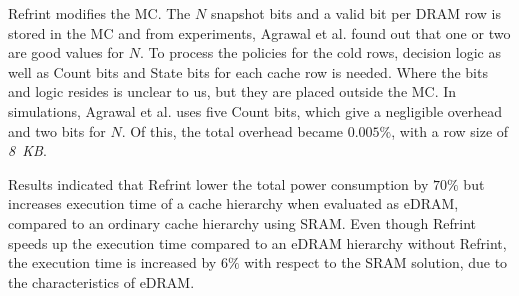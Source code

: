 Refrint modifies the MC. The $N$ snapshot bits and a valid bit per DRAM row is stored in the MC and from experiments, Agrawal et al. found out that one or two are good values for $N$. To process the policies for the cold rows, decision logic as well as Count bits and State bits for each cache row is needed. Where the bits and logic resides is unclear to us, but they are placed outside the MC. In simulations, Agrawal et al. uses five Count bits, which give a negligible overhead and two bits for $N$. Of this, the total overhead became $0.005\%$, with a row size of \textit{8~KB}.

Results indicated that Refrint lower the total power consumption by $70\%$ but increases execution time of a cache hierarchy when evaluated as eDRAM, compared to an ordinary cache hierarchy using SRAM. Even though Refrint speeds up the execution time compared to an eDRAM hierarchy without Refrint, the execution time is increased by $6\%$  with respect to the SRAM solution, due to the characteristics of eDRAM.